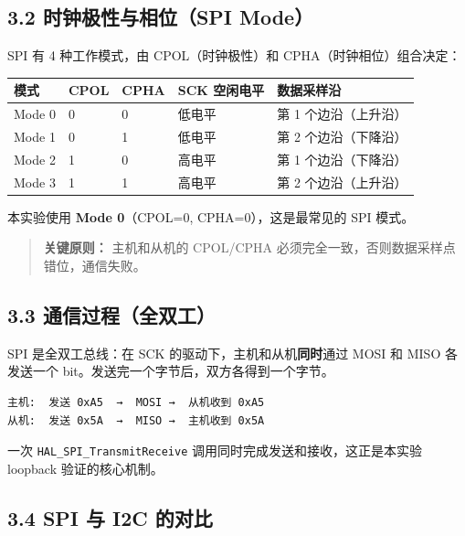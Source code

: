 \documentclass[
  chinese,
  UTF8,
  oneside,
  openany]{ctexbook}
\begin{document}
\subsection{3.2 时钟极性与相位（SPI
Mode）}\label{ux65f6ux949fux6781ux6027ux4e0eux76f8ux4f4dspi-mode}

SPI 有 4 种工作模式，由 CPOL（时钟极性）和 CPHA（时钟相位）组合决定：

\begin{longtable}[]{@{}lllll@{}}
\toprule\noalign{}
模式 & CPOL & CPHA & SCK 空闲电平 & 数据采样沿 \\
\midrule\noalign{}
\endhead
\bottomrule\noalign{}
\endlastfoot
Mode 0 & 0 & 0 & 低电平 & 第 1 个边沿（上升沿） \\
Mode 1 & 0 & 1 & 低电平 & 第 2 个边沿（下降沿） \\
Mode 2 & 1 & 0 & 高电平 & 第 1 个边沿（下降沿） \\
Mode 3 & 1 & 1 & 高电平 & 第 2 个边沿（上升沿） \\
\end{longtable}

本实验使用 \textbf{Mode 0}（CPOL=0, CPHA=0），这是最常见的 SPI 模式。

\begin{quote}
\textbf{关键原则：} 主机和从机的 CPOL/CPHA
必须完全一致，否则数据采样点错位，通信失败。
\end{quote}

\subsection{3.3
通信过程（全双工）}\label{ux901aux4fe1ux8fc7ux7a0bux5168ux53ccux5de5}

SPI 是全双工总线：在 SCK 的驱动下，主机和从机\textbf{同时}通过 MOSI 和
MISO 各发送一个 bit。发送完一个字节后，双方各得到一个字节。

\begin{verbatim}
主机:  发送 0xA5  →  MOSI →  从机收到 0xA5
从机:  发送 0x5A  →  MISO →  主机收到 0x5A
\end{verbatim}

一次 \texttt{HAL\_SPI\_TransmitReceive}
调用同时完成发送和接收，这正是本实验 loopback 验证的核心机制。

\subsection{3.4 SPI 与 I2C
的对比}\label{spi-ux4e0e-i2c-ux7684ux5bf9ux6bd4}
\end{document}
